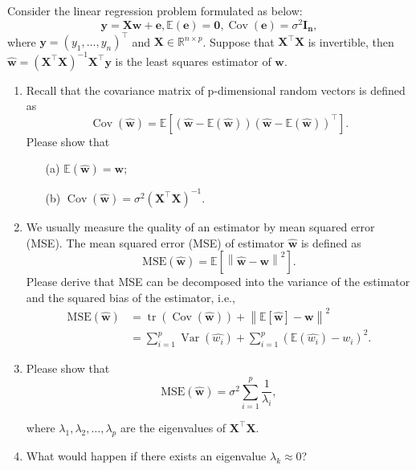 \documentclass[11pt,letter,notitlepage]{article}
\begin{document}
\newpage
\begin{exercise}[Multicollinearity]
	Consider the linear regression problem formulated as below:
	$$\mathbf{y} = \mathbf{X} \mathbf{ w + e}, \mathbb{E}(\mathbf{e}) = \mathbf{0}, \operatorname{Cov}(\mathbf{e}) = \sigma^2 \mathbf{I_n}, $$where $\mathbf{y}=\left(y_{1}, \ldots, y_{n}\right)^{\top}$ and $\mathbf{X} \in \mathbb{R}^{n \times p}$. Suppose that $\mathbf{X}^{\top}\mathbf{X}$ is invertible, then $\hat{\mathbf{w}} = \left(\mathbf{X}^{\top} \mathbf{X}\right)^{-1} \mathbf{X}^{\top} \mathbf{y}$ is the least squares estimator of $\mathbf{w}$.
	\begin{enumerate}
		\item Recall that the covariance matrix of p-dimensional random vectors is defined as $$\operatorname{Cov}(\hat{\mathbf{w}}) = \mathbb{E}\mathbf{[(\hat{\mathbf{w}}-\mathbb{E}(\hat{\mathbf{w}}))(\hat{\mathbf{w}}-\mathbb{E}(\hat{\mathbf{w}}))^{\top}]}.$$
		Please show that
		\begin{enumerate}
			\item[(a)] $\mathbb{E}(\hat{\mathbf{w}}) = \mathbf{w}$;
			\item[(b)] $\operatorname{Cov}(\hat{\mathbf{w}}) = \sigma^2 \left(\mathbf{X}^{\top} \mathbf{X}\right)^{-1}$.
		\end{enumerate}
		\item We usually measure the quality of an estimator by mean squared error (MSE). The mean squared error (MSE) of estimator $\hat{\mathbf{w}}$ is defined as 	$$\text{MSE}(\hat{\mathbf{w}}) = \mathbb{E}[\left\|\hat{\mathbf{w}} - \mathbf{w}\right\|^2] .$$ Please derive that MSE can be decomposed into the variance of the estimator and the squared bias of the estimator, i.e.,
			$$\begin{aligned}
			\text{MSE}(\hat{\mathbf{w}}) &= \operatorname{tr}\left(\operatorname{Cov}(\hat{\mathbf{w}})\right) + \left\|\mathbb{E}[\hat{\mathbf{w}}]-\mathbf{w}\right\|^2\\
			&=\sum_{i=1}^{p} \operatorname{Var}(\hat{w_i}) + \sum_{i=1}^{p}  (\mathbb{E} (\hat{w_i})-w_i)^2.
		\end{aligned}$$
		\item Please show that
		$$\text{MSE}(\hat{\mathbf{w}}) = \sigma^2 \sum_{i=1}^{p} \frac{1}{\lambda_i},$$
		
		where $\lambda_1,\lambda_2,\ldots,\lambda_{p}$ are the eigenvalues of $\mathbf{X}^{\top} \mathbf{X}$.
		\item What would happen if there exists an eigenvalue $\lambda_k \approx 0$?
	\end{enumerate}
\end{exercise}
\end{document}
